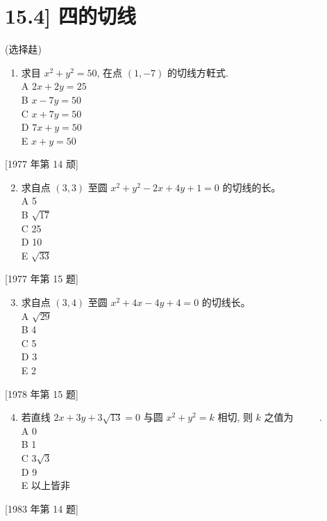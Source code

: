 \documentclass[10pt]{article}
\begin{document}
\section*{15.4] 四的切线}
(选择䞨)

\begin{enumerate}
  \item 求目 $x^{2}+y^{2}=50$, 在点 $(1,-7)$ 的切线方軖式.\\
A $2 x+2 y=25$\\
B $x-7 y=50$\\
C $x+7 y=50$\\
D $7 x+y=50$\\
E $x+y=50$
\end{enumerate}

[1977 年第 14 顽]

\begin{enumerate}
  \setcounter{enumi}{1}
  \item 求自点 $(3,3)$ 至圆 $x^{2}+y^{2}-2 x+4 y+1=0$ 的切线的长。\\
A 5\\
B $\sqrt{17}$\\
C 25\\
D 10\\
E $\sqrt{33}$
\end{enumerate}

[1977 年第 15 题]

\begin{enumerate}
  \setcounter{enumi}{2}
  \item 求自点 $(3,4)$ 至圆 $x^{2}+4 x-4 y+4=0$ 的切线长。\\
A $\sqrt{29}$\\
B 4\\
C 5\\
D 3\\
E 2
\end{enumerate}

[1978 年第 15 题]

\begin{enumerate}
  \setcounter{enumi}{3}
  \item 若直线 $2 x+3 y+3 \sqrt{13}=0$ 与圆 $x^{2}+y^{2}=k$ 相切, 则 $k$ 之值为 $\qquad$ .\\
A 0\\
B 1\\
C $3 \sqrt{3}$\\
D 9\\
E 以上皆非
\end{enumerate}

[1983 年第 14 题]
\end{document}

